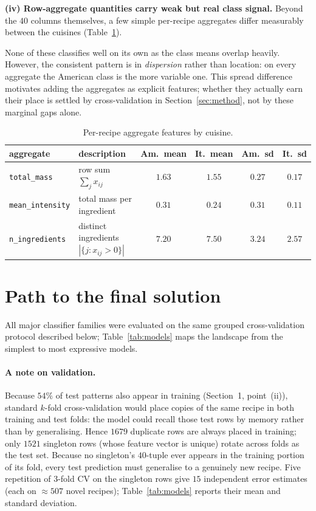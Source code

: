 \documentclass[11pt,a4paper]{article}
\begin{document}
\textbf{(iv) Row-aggregate quantities carry weak but real class signal.} Beyond the $40$
columns themselves, a few simple per-recipe aggregates differ measurably between the
cuisines (Table~\ref{tab:aggr}). 

None of these classifies well on its own as the class
means overlap heavily. However, the consistent pattern is in \emph{dispersion} rather than
location: on every aggregate the American class is the more variable one. This spread
difference motivates adding the aggregates as explicit features; whether they actually earn
their place is settled by cross-validation in Section~\ref{sec:method}, not by these
marginal gaps alone.

\begin{table}[h]
\centering\small
\begin{tabular}{llcccc}
\toprule
aggregate & description & Am.\ mean & It.\ mean & Am.\ sd & It.\ sd \\
\midrule
\texttt{total\_mass}     & row sum $\sum_j x_{ij}$                 & $1.63$ & $1.55$ & $0.27$ & $0.17$ \\
\texttt{mean\_intensity} & total mass per ingredient               & $0.31$ & $0.24$ & $0.31$ & $0.11$ \\
\texttt{n\_ingredients}  & distinct ingredients $|\{j:x_{ij}>0\}|$ & $7.20$ & $7.50$ & $3.24$ & $2.57$ \\
\bottomrule
\end{tabular}
\caption{Per-recipe aggregate features by cuisine.}
\label{tab:aggr}
\end{table}


\section{Path to the final solution}

All major classifier families were evaluated on the same grouped cross-validation
protocol described below; Table~\ref{tab:models} maps the landscape from the simplest to
most expressive models.

\paragraph{A note on validation.}
Because $54\%$ of test patterns also appear in training (Section~1, point~(ii)), standard
$k$-fold cross-validation would place copies of the same recipe in both training and test
folds: the model could recall those test rows by memory rather than by generalising. Hence $1679$ duplicate rows are
always placed in training; only $1521$ singleton rows (whose feature vector is unique) rotate across folds as the test set. Because no singleton's $40$-tuple ever appears in the training portion of its fold, every test
prediction must generalise to a genuinely new recipe. Five repetition of $3$-fold CV on the
singleton rows give $15$ independent error estimates (each on $\approx 507$ novel recipes);
Table~\ref{tab:models} reports their mean and standard deviation.
\end{document}
